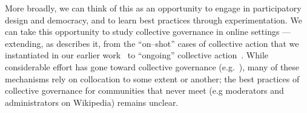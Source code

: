 \documentclass{article}
\newcommand{\topic}[1]{{\color{Blue}#1}}
\begin{document}
\topic{More broadly, we can think of this as an opportunity to engage in participatory design and democracy, and
to learn best practices through experimentation.}
We can take this opportunity to study collective governance in online settings
--- extending, as \citeauthor{russell1982collective} describes it,
from the ``on--shot'' cases of collective action that we instantiated in our earlier work~\cite{dynamo} to ``ongoing'' collective action~\cite{russell1982collective}.
While considerable effort has gone toward collective governance
(e.g.~\cite{ostrom1990governing,mccallum2013global,ahlquist2013interest,olsonlogic,polletta2002freedom}),
many of these mechanisms rely on collocation to some extent or another;
the best practices of collective governance for communities that never meet
(e.g moderators and administrators on Wikipedia)
remains unclear.



\begin{comment}
\topic{We're pursuing the design of a system that offers a very narrow slice of workers' needs based on
what we've learned so far from gig workers, and from the historical timeline that we saw in piecework.}
Informed by our observations from fieldwork while organizing and motivating collective action~\cite{dynamo}
and from other research~\cite{martin2014being},
we've found that gig workers are highly resistant to traditional labor advocacy and empowerment tools, such as labor unions.
In part, this may be because the conventional systems of affiliations and labor unions are a poor match;
to say nothing of responding to the varied needs of people who participate in the gig economy to differing degrees,
what we consider conventional labor advocacy structures is anathema to gig workers:
``If you mean a `labor union', I would not feel comfortable taking part.
It runs against my grain because I am an individualist.
[\dots]~I consider myself self--employed\dots~not working for anyone in particular''.
Looking through piecework's history, we found that similar sentiments existed in the early years of piecework~\cite{pieceworkCrowdworkGigwork}.
While this sentiment shifted over the following decades, it's worth considering that this shift occurred over a number of years, and
only as people became increasingly familiar with the conclusion that forms of gig 
\end{comment}
\end{document}
